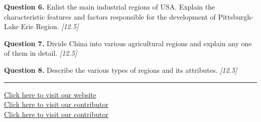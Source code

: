 \documentclass[11pt,a4paper]{article}
\newcommand{\pts}[1]{\hfill   \textit{[#1]}}
\begin{document}
\medskip


\noindent   \textbf{Question 6.} Enlist the main industrial regions of USA. Explain the characteristic features and factors responsible for the development of Pittsburgh-Lake Erie Region. \pts{12.5}

\medskip


\noindent   \textbf{Question 7.} Divide China into various agricultural regions and explain any one of them in detail. \pts{12.5}

\medskip


\noindent   \textbf{Question 8.} Describe the various types of regions and its attributes. \pts{12.5}

\vfill\rule{\linewidth}{0.4pt}

\begin{center}\small
\href{https://bhu-exam.vercel.app/}{Click here to visit our website}\\[4pt]
\href{https://me-aryan.vercel.app/}{Click here to visit our contributor}\\[4pt]
\href{https://quashan-me.vercel.app/}{Click here to visit our contributor}
\end{center}
\end{document}
